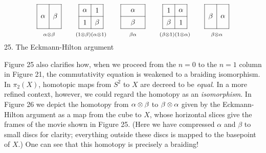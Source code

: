 \bfig
\[ 
 \xy
 (-6,6)*{}="TL";
 (-6,-6)*{}="BL";
 (6,6)*{}="TR";
 (6,-6)*{}="BR";
 (0,6)*{}="MT";
 (0,-6)*{}="MB";
 "TL";"TR" **\dir{-};
 "TL";"BL" **\dir{-};
 "TR";"BR" **\dir{-};
 "BL";"BR" **\dir{-};
 "MT";"MB" **\dir{-};
 (3,0)*{\beta};
 (-3,0)*{\alpha};
 (0,-9)*{\scriptstyle \alpha \tensor \beta};
 \endxy
\qquad
 \xy
 (-6,6)*{}="TL";
 (-6,-6)*{}="BL";
 (6,6)*{}="TR";
 (6,-6)*{}="BR";
 (0,6)*{}="MT";
 (0,-6)*{}="MB";
 (-6,0)*{}="LM";
 (6,0)*{}="LR";
 "TL";"TR" **\dir{-};
 "TL";"BL" **\dir{-};
 "TR";"BR" **\dir{-};
 "BL";"BR" **\dir{-};
 "MT";"MB" **\dir{-};
  "LM";"LR" **\dir{-};
 (3,-3)*{\beta};
 (-3,3)*{\alpha};
 (-3,-3)*{1};
 (3,3)*{1};
 (0,-9)*{\scriptstyle (1 \tensor \beta)(\alpha \tensor 1)};
 \endxy
 \qquad
  \xy
 (-6,6)*{}="TL";
 (-6,-6)*{}="BL";
 (6,6)*{}="TR";
 (6,-6)*{}="BR";
 (-6,0)*{}="LM";
 (6,0)*{}="LR";
 "TL";"TR" **\dir{-};
 "TL";"BL" **\dir{-};
 "TR";"BR" **\dir{-};
 "BL";"BR" **\dir{-};
  "LM";"LR" **\dir{-};
 (0,-3)*{\beta};
 (0,3)*{\alpha};
 (0,-9)*{\scriptstyle \beta\alpha};
 \endxy
 \qquad
  \xy
 (-6,6)*{}="TL";
 (-6,-6)*{}="BL";
 (6,6)*{}="TR";
 (6,-6)*{}="BR";
 (0,6)*{}="MT";
 (0,-6)*{}="MB";
 (-6,0)*{}="LM";
 (6,0)*{}="LR";
 "TL";"TR" **\dir{-};
 "TL";"BL" **\dir{-};
 "TR";"BR" **\dir{-};
 "BL";"BR" **\dir{-};
 "MT";"MB" **\dir{-};
  "LM";"LR" **\dir{-};
 (-3,-3)*{\beta};
 (3,3)*{\alpha};
 (3,-3)*{1};
 (-3,3)*{1};
 (0,-9)*{\scriptstyle (\beta  \tensor 1)(1 \tensor \alpha)};
 \endxy
 \qquad
  \xy
 (-6,6)*{}="TL";
 (-6,-6)*{}="BL";
 (6,6)*{}="TR";
 (6,-6)*{}="BR";
 (0,6)*{}="MT";
 (0,-6)*{}="MB";
 "TL";"TR" **\dir{-};
 "TL";"BL" **\dir{-};
 "TR";"BR" **\dir{-};
 "BL";"BR" **\dir{-};
 "MT";"MB" **\dir{-};
 (-3,0)*{\beta};
 (3,0)*{\alpha};
 (0,-9)*{\scriptstyle  \beta \tensor \alpha };
 \endxy
\]
25.  The Eckmann-Hilton argument
\efig

Figure 25 also clarifies how, when we proceed from the $n = 0$ to
the $n = 1$ column in Figure 21, the commutativity equation is
weakened to a braiding isomorphism.  In $\pi_2(X)$, homotopic
maps from  $S^2$ to $X$ are decreed to be {\it equal}.  In a more
refined context, however, we could regard the homotopy as an {\it
isomorphism}.  In Figure 26 we depict the homotopy from
$\alpha\otimes\beta$ to $\beta\otimes\alpha$ given by the
Eckmann-Hilton argument as a map from the cube to $X$, whose
horizontal slices give the frames of the movie shown in Figure
25. (Here we have compressed $\alpha$ and $\beta$ to small
discs for clarity; everything outside these discs is mapped
to the basepoint of $X$.)  One can see that this homotopy is
precisely a braiding!

